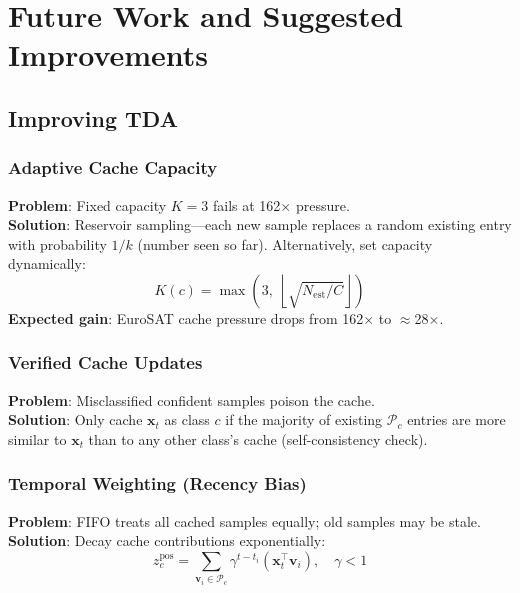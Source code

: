 \documentclass[12pt,a4paper]{article}
\newcommand{\bx}{\mathbf{x}}
\newcommand{\1}{\mathbf{1}}
\begin{document}
\section{Future Work and Suggested Improvements}

\subsection{Improving TDA}

\subsubsection{Adaptive Cache Capacity}
\textbf{Problem}: Fixed capacity $K=3$ fails at 162$\times$ pressure.\\
\textbf{Solution}: Reservoir sampling---each new sample replaces a random existing entry with probability $1/k$ (number seen so far).
Alternatively, set capacity dynamically:
\begin{equation}
  K(c) = \max\!\left(3,\; \left\lfloor\sqrt{N_{\text{est}} / C}\right\rfloor\right)
\end{equation}
\textbf{Expected gain}: EuroSAT cache pressure drops from 162$\times$ to $\approx$28$\times$.

\subsubsection{Verified Cache Updates}
\textbf{Problem}: Misclassified confident samples poison the cache.\\
\textbf{Solution}: Only cache $\bx_t$ as class $c$ if the majority of existing $\mathcal{P}_c$ entries are more similar to $\bx_t$ than to any other class's cache (self-consistency check).

\subsubsection{Temporal Weighting (Recency Bias)}
\textbf{Problem}: FIFO treats all cached samples equally; old samples may be stale.\\
\textbf{Solution}: Decay cache contributions exponentially:
\begin{equation}
  z^{\text{pos}}_c = \sum_{\mathbf{v}_i \in \mathcal{P}_c} \gamma^{t - t_i} (\bx_t^\top \mathbf{v}_i), \quad \gamma < 1
\end{equation}
\end{document}
